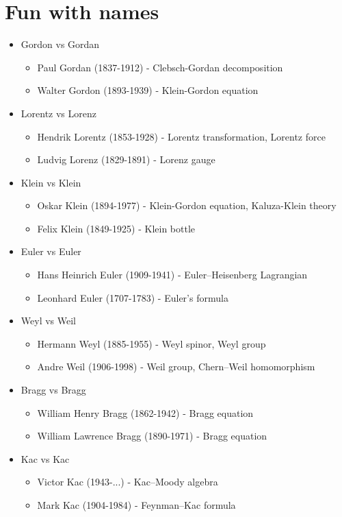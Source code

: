 \documentclass[10pt,a4paper]{article}
\theoremstyle{definition}
\begin{document}
\newpage
\section{Fun with names}
\begin{itemize}
\item Gordon vs Gordan
    \begin{itemize}
    \item {\sc Paul Gordan} (1837-1912) - Clebsch-Gordan decomposition
    \item {\sc Walter Gordon} (1893-1939) - Klein-Gordon equation
    \end{itemize}
\item Lorentz vs Lorenz
    \begin{itemize}
    \item {\sc Hendrik Lorentz} (1853-1928) - Lorentz transformation, Lorentz force
    \item {\sc Ludvig Lorenz} (1829-1891) - Lorenz gauge
    \end{itemize}
\item Klein vs Klein
    \begin{itemize}
    \item {\sc Oskar Klein} (1894-1977) - Klein-Gordon equation, Kaluza-Klein theory
    \item {\sc Felix Klein} (1849-1925) - Klein bottle
    \end{itemize}
\item Euler vs Euler
    \begin{itemize}
    \item {\sc Hans Heinrich Euler} (1909-1941) - Euler–Heisenberg Lagrangian
    \item {\sc Leonhard Euler} (1707-1783) - Euler's formula
    \end{itemize}
\item Weyl vs Weil
    \begin{itemize}
    \item {\sc Hermann Weyl} (1885-1955) - Weyl spinor, Weyl group
    \item {\sc Andre Weil} (1906-1998) - Weil group, Chern–Weil homomorphism
    \end{itemize}
\item Bragg vs Bragg
    \begin{itemize}
    \item {\sc William Henry Bragg} (1862-1942) - Bragg equation
    \item {\sc William Lawrence Bragg} (1890-1971) - Bragg equation
    \end{itemize}   
\item Kac vs Kac
    \begin{itemize}
    \item {\sc Victor Kac} (1943-...) - Kac–Moody algebra
    \item {\sc Mark Kac} (1904-1984) - Feynman–Kac formula
    \end{itemize}
\end{itemize}
\end{document}
